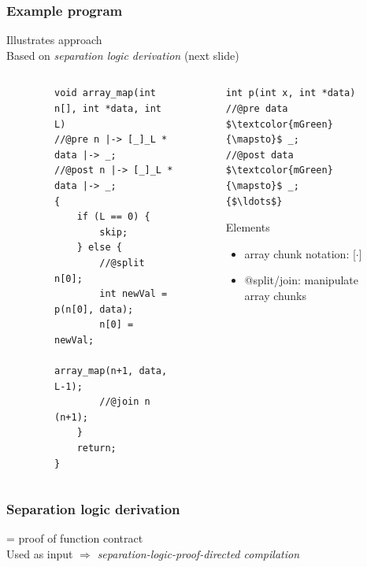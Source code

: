 \documentclass{beamer}
\begin{document}
\begin{frame}[fragile]
\frametitle{Example program} %
Illustrates approach\\
Based on \emph{separation logic derivation} (next slide)
\begin{columns}
\begin{column}{0.015\textwidth}
\end{column}
\begin{column}{0.55\textwidth}
\begin{figure}[h]
  \centering
\begin{lstlisting}[style=CStyle, captionpos = t]
void array_map(int n[], int *data, int L)
//@pre n |-> [_]_L * data |-> _;
//@post n |-> [_]_L * data |-> _;
{
	if (L == 0) { 
		skip;
	} else {
		//@split n[0];
		int newVal = p(n[0], data);
		n[0] = newVal;
		array_map(n+1, data, L-1);
		//@join n (n+1);
	}
	return; 
}
\end{lstlisting}
\end{figure}
\end{column}
\begin{column}{0.43\textwidth}
\begin{lstlisting}[style=CStyle, captionpos = t]
int p(int x, int *data)
//@pre data $\textcolor{mGreen}{\mapsto}$ _; 
//@post data $\textcolor{mGreen}{\mapsto}$ _;
{$\ldots$}
\end{lstlisting}
\begin{block}{Elements}
\begin{itemize}
\item array chunk notation: [$\cdot$]
\item @split/join: manipulate array chunks
\end{itemize}
\end{block}
\end{column}
\begin{column}{0.005\textwidth}
\end{column}
\end{columns}
\end{frame}
\begin{frame}
\frametitle{Separation logic derivation}
= proof of function contract\\
\vspace{.5em}
\vspace{.5em}
Used as input $\Rightarrow$ \emph{separation-logic-proof-directed compilation}
\end{frame}
\end{document}
